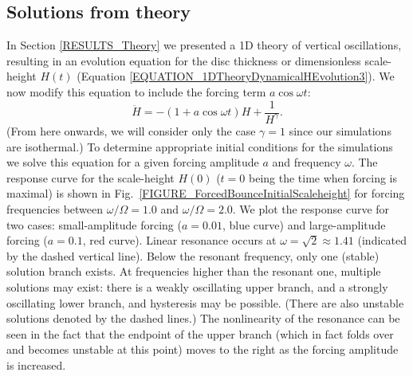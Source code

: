 \documentclass[fleqn,usenatbib]{mnras}
\newcommand{\dd}{\mathrm{d}}
\begin{document}
\subsection{Solutions from theory}
\label{SECTION_ForcedBounceTheory}
In Section \ref{RESULTS_Theory} we presented a 1D theory of vertical oscillations, resulting in an evolution equation for the disc thickness or dimensionless scale-height $H(t)$ (Equation \ref{EQUATION_1DTheoryDynamicalHEvolution3}). We now modify this equation to include the forcing term $a \cos{\omega t}$:
\begin{equation}
    \ddot H = -(1 + a \cos\omega t )H + \frac{1}{H^\gamma}.
\end{equation}
(From here onwards, we will consider only the case $\gamma = 1$ since our simulations are isothermal.) To determine appropriate initial conditions for the simulations we solve this equation for a given forcing amplitude $a$ and frequency $\omega$. The response curve for the scale-height $H(0)$ ($t=0$ being the time when forcing is maximal) is shown in Fig.~\ref{FIGURE_ForcedBounceInitialScaleheight} for forcing frequencies between $\omega/\Omega = 1.0$ and $\omega/\Omega = 2.0$. We plot the response curve for two cases: small-amplitude forcing ($a=0.01$, blue curve) and large-amplitude forcing ($a=0.1$, red curve). Linear resonance \citep{lubow1981vertically} occurs at $\omega = \sqrt{2} \approx 1.41$ (indicated by the dashed vertical line). Below the resonant frequency, only one (stable) solution branch exists. At frequencies higher than the resonant one, multiple solutions may exist: there is a weakly oscillating upper branch, and a strongly oscillating lower branch, and hysteresis may be possible. (There are also unstable solutions denoted by the dashed lines.) The nonlinearity of the resonance can be seen in the fact that the endpoint of the upper branch (which in fact folds over and becomes unstable at this point) moves to the right as the forcing amplitude is increased.
\end{document}
